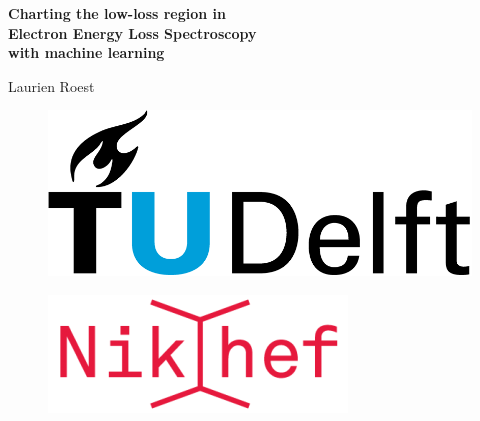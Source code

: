 \documentclass[12pt,a4paper]{article}
\newcommand\blankpage{
    \null
    \thispagestyle{empty}
    \addtocounter{page}{-1}
    \newpage
    }
\numberwithin{equation}{section}
\numberwithin{figure}{section}
\numberwithin{table}{section}
\begin{document}



\vspace{5cm}

\begin{center}
  {\Huge \bf Charting the low-loss region in \\[0.3cm] Electron Energy Loss Spectroscopy \\[0.4cm] with machine learning}
\vspace{1.4cm}

{\LARGE Laurien Roest}

\vspace{1.0cm}
 


\vspace{5cm}
\end{center}


\begin{figure}[h]
\centering
\includegraphics[width=0.3\linewidth]{plots/TUDelft_logo.png} 
\end{figure}

\begin{figure}[h]
\centering
\includegraphics[width=0.3\linewidth]{plots/Nikhef_logo.png}
\end{figure}

\thispagestyle{empty}
\afterpage{\blankpage}

\newpage
{}
\vspace{3cm}
\end{document}
